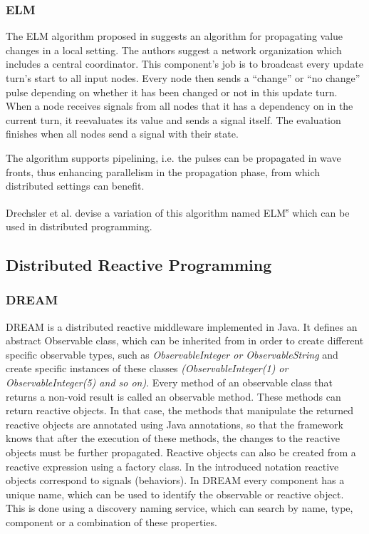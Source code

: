 \documentclass{sigplanconf}
\begin{document}
\subsubsection{ELM}
The ELM algorithm proposed in \cite{elm} suggests an algorithm for propagating value changes in a local setting. The authors suggest a network organization which includes a central coordinator. This component's job is to broadcast every update turn's start to all input nodes. Every node then sends a ``change'' or ``no change'' pulse depending on whether it has been changed or not in this update turn. When a node receives signals from all nodes that it has a dependency on in the current turn, it reevaluates its value and sends a signal itself. The evaluation finishes when all nodes send a signal with their state.

The algorithm supports pipelining, i.e. the pulses can be propagated in wave fronts, thus enhancing parallelism in the propagation phase, from which distributed settings can benefit.

Drechsler et al. \cite{sidup} devise a variation of this algorithm named ELM\textsuperscript{s} which can be used in distributed programming.

\subsection{Distributed Reactive Programming}

\subsubsection{DREAM}
DREAM \cite{dream} is a distributed reactive middleware implemented in Java. It defines an abstract Observable class, which can be inherited from in order to create different specific observable types, such as \textit{ObservableInteger or ObservableString} and create specific instances of these classes \textit{(ObservableInteger(1) or ObservableInteger(5) and so on)}. Every method of an observable class that returns a non-void result is called an observable method. These methods can return reactive objects. In that case, the methods that manipulate the returned reactive objects are annotated using Java annotations, so that the framework knows that after the execution of these methods, the changes to the reactive objects must be further propagated. 
Reactive objects can also be created from a reactive expression using a factory class. In the introduced notation reactive objects correspond to signals (behaviors).
In DREAM every component has a unique name, which can be used to identify the observable or reactive object. This is done using a discovery naming service, which can search by name, type, component or a combination of these properties.
\end{document}
